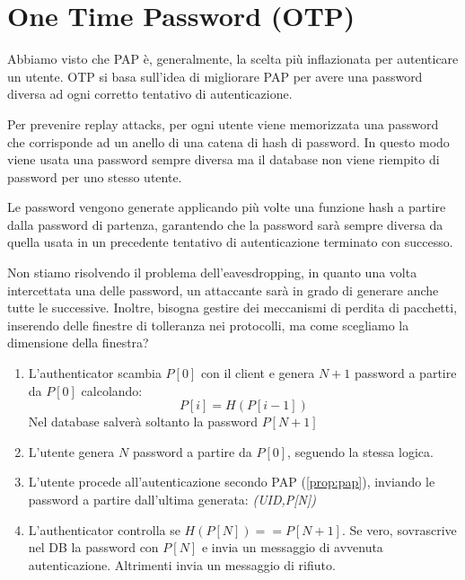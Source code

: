 \section{One Time Password (OTP)}
Abbiamo visto che PAP è, generalmente, la scelta più inflazionata per autenticare un utente. OTP si basa sull'idea di migliorare PAP per avere una password diversa ad ogni corretto tentativo di autenticazione. 
\begin{note}
Per prevenire replay attacks, per ogni utente viene memorizzata una password che corrisponde ad un anello di una catena di hash di password. In questo modo viene usata una password sempre diversa ma il database non viene riempito di password per uno stesso utente.
\end{note}
\begin{definition}
Le password vengono generate applicando più volte una funzione hash a partire dalla password di partenza, garantendo che la password sarà sempre diversa da quella usata in un precedente tentativo di autenticazione terminato con successo.
\end{definition}
\begin{remark}
Non stiamo risolvendo il problema dell'eavesdropping, in quanto una volta intercettata una delle password, un attaccante sarà in grado di generare anche tutte le successive. Inoltre, bisogna gestire dei meccanismi di perdita di pacchetti, inserendo delle finestre di tolleranza nei protocolli, ma come scegliamo la dimensione della finestra?
\end{remark}
\begin{proposition}\label{prop:otp}
\begin{enumerate}
    \item L'authenticator scambia $P[0]$ con il client e genera $N+1$ password a partire da $P[0]$ calcolando:
    \begin{equation*}
        P[i]=H(P[i-1])
    \end{equation*}
    Nel database salverà soltanto la password $P[N+1]$
    \item L'utente genera $N$ password a partire da $P[0]$, seguendo la stessa logica.
    \item L'utente procede all'autenticazione secondo PAP (\cref{prop:pap}), inviando le password a partire dall'ultima generata: \textit{(UID,P[N])}
    \item L'authenticator controlla se $H(P[N])==P[N+1]$. Se vero, sovrascrive nel DB la password con $P[N]$ e invia un messaggio di avvenuta autenticazione. Altrimenti invia un messaggio di rifiuto.
\end{enumerate}
\end{proposition}
